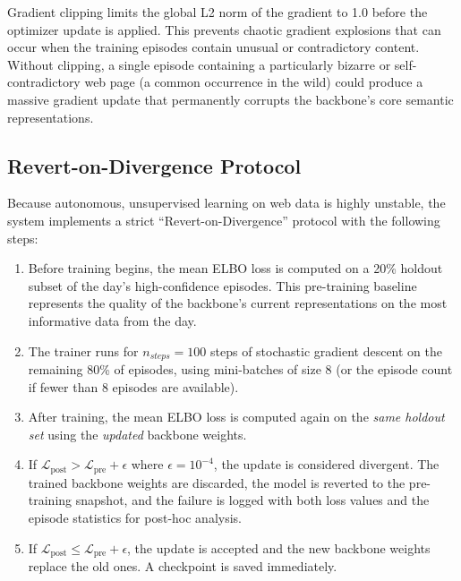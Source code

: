 Gradient clipping limits the global L2 norm of the gradient to 1.0 before the optimizer update is applied. This prevents chaotic gradient explosions that can occur when the training episodes contain unusual or contradictory content. Without clipping, a single episode containing a particularly bizarre or self-contradictory web page (a common occurrence in the wild) could produce a massive gradient update that permanently corrupts the backbone's core semantic representations.

\subsection{Revert-on-Divergence Protocol}

Because autonomous, unsupervised learning on web data is highly unstable, the system implements a strict ``Revert-on-Divergence'' protocol with the following steps:

\begin{enumerate}
    \item Before training begins, the mean ELBO loss is computed on a 20\% holdout subset of the day's high-confidence episodes. This pre-training baseline represents the quality of the backbone's current representations on the most informative data from the day.

    \item The trainer runs for $n_{steps} = 100$ steps of stochastic gradient descent on the remaining 80\% of episodes, using mini-batches of size 8 (or the episode count if fewer than 8 episodes are available).

    \item After training, the mean ELBO loss is computed again on the \textit{same holdout set} using the \textit{updated} backbone weights.

    \item If $\mathcal{L}_{\text{post}} > \mathcal{L}_{\text{pre}} + \epsilon$ where $\epsilon = 10^{-4}$, the update is considered divergent. The trained backbone weights are discarded, the model is reverted to the pre-training snapshot, and the failure is logged with both loss values and the episode statistics for post-hoc analysis.

    \item If $\mathcal{L}_{\text{post}} \leq \mathcal{L}_{\text{pre}} + \epsilon$, the update is accepted and the new backbone weights replace the old ones. A checkpoint is saved immediately.
\end{enumerate}

